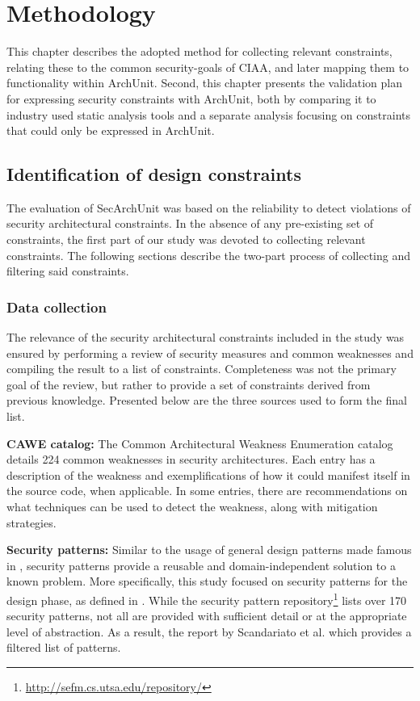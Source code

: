 \chapter{Methodology}

This chapter describes the adopted method for collecting relevant constraints, relating these to the common security-goals of CIAA, and later mapping them to functionality within ArchUnit. Second, this chapter presents the validation plan for expressing security constraints with ArchUnit, both by comparing it to industry used static analysis tools and a separate analysis focusing on constraints that could only be expressed in ArchUnit.

\section{Identification of design constraints}

The evaluation of SecArchUnit was based on the reliability to detect violations of security architectural constraints. In the absence of any pre-existing set of constraints, the first part of our study was devoted to collecting relevant constraints. The following sections describe the two-part process of collecting and filtering said constraints. 

\subsection{Data collection} \label{sec:data_collection}

The relevance of the security architectural constraints included in the study was ensured by performing a review of security measures and common weaknesses and compiling the result to a list of constraints. Completeness was not the primary goal of the review, but rather to provide a set of constraints derived from previous knowledge. Presented below are the three sources used to form the final list. 

\textbf{CAWE catalog:}
The Common Architectural Weakness Enumeration catalog \cite{santos_catalog_2017} details 224 common weaknesses in security architectures. Each entry has a description of the weakness and exemplifications of how it could manifest itself in the source code, when applicable. In some entries, there are recommendations on what techniques can be used to detect the weakness, along with mitigation strategies.

\textbf{Security patterns:}
Similar to the usage of general design patterns made famous in \cite{gamma_design_1995}, security patterns provide a reusable and domain-independent solution to a known problem. More specifically, this study focused on security patterns for the design phase, as defined in \cite{yoshioka_survey_2008}. While the security pattern repository\footnote{\url{http://sefm.cs.utsa.edu/repository/}} lists over 170 security patterns, not all are provided with sufficient detail or at the appropriate level of abstraction. As a result, the report by Scandariato et al. \cite{scandariato_system_2006}  which provides a filtered list of patterns.


